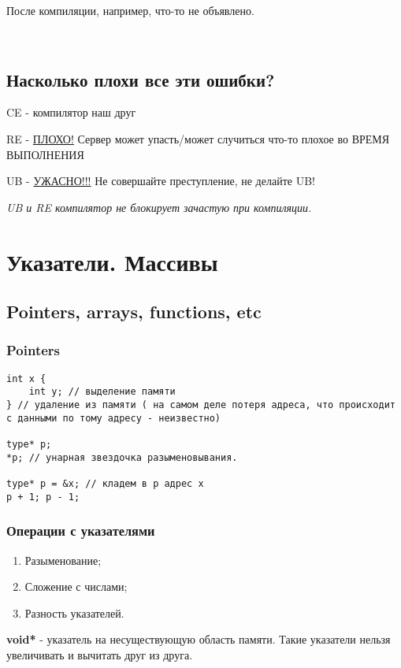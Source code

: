 \documentclass[12pt]{article}
\begin{document}
После компиляции, например, что-то не объявлено.

\

\subsection{Насколько плохи все эти ошибки?} 

CE - компилятор наш друг

RE - \underline{ПЛОХО!} Сервер может упасть/может случиться что-то плохое во ВРЕМЯ ВЫПОЛНЕНИЯ

UB - \underline{УЖАСНО!!!} Не совершайте преступление, не делайте UB!

\textit{UB и RE компилятор не блокирует зачастую при компиляции.}

\section{Указатели. Массивы}

\subsection{Pointers, arrays, functions, etc}

\subsubsection{Pointers}

\begin{lstlisting}
int x {
	int y; // выделение памяти
} // удаление из памяти ( на самом деле потеря адреса, что происходит с данными по тому адресу - неизвестно)

type* p; 
*p; // унарная звездочка разыменовывания.

type* p = &x; // кладем в p адрес x
p + 1; p - 1;
\end{lstlisting}

\subsubsection{Операции с указателями}
\begin{enumerate}
\item Разыменование;
\item Сложение с числами;
\item Разность указателей. 
\end{enumerate}

\textbf{void*} - указатель на несуществующую область памяти. Такие указатели нельзя увеличивать и вычитать друг из друга.
\end{document}
